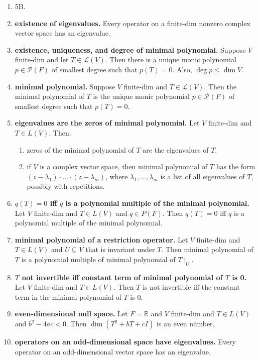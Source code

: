 \begin{enumerate}
	\item 5B. 
	\item \textbf{existence of eigenvalues. } Every operator on a finite-dim nonzero complex vector space has an eigenvalue. 
	\item \textbf{existence, uniqueness, and degree of minimal polynomial. } Suppose $V$ finite-dim and let $T \in \mathscr{L}(V)$. Then there is a unique monic polynomial $p \in \mathscr{P}(F)$ of smallest degree such that $p(T)=0$. Also, $\deg p \leq \dim V$. 
	\item \textbf{minimal polynomial. } Suppose $V$ finite-dim and $T \in \mathscr{L}(V)$. Then the minimal polynomial of $T$ is the unique monic polynomial $p \in \mathscr{P}(F)$ of smallest degree such that $p(T)=0$. 
	\item \textbf{eigenvalues are the zeros of minimal polynomial. } Let $V$ finite-dim and $T \in L(V)$. Then: 
	\begin{enumerate}
		\item zeros of the minimal polynomial of $T$ are the eigenvalues of $T$. 
		\item if $V$ is a complex vector space, then minimal polynomial of $T$ has the form $(z-\lambda_1) \cdot \dots \cdot (z-\lambda_m)$, where $\lambda_1,\dots,\lambda_m$ is a list of all eigenvalues of $T$, possibly with repetitions. 
	\end{enumerate}
	\item \textbf{$q(T)=0$ iff $q$ is a polynomial multiple of the minimal polynomial. } Let $V$ finite-dim and $T \in L(V)$ and $q \in P(F)$. Then $q(T)=0$ iff $q$ is a polynomial multiple of the minimal polynomial. 
	\item \textbf{minimal polynomial of a restriction operator. } Let $V$ finite-dim and $T \in L(V)$ and $U \subseteq V$ that is invariant under $T$. Then minimal polynomial of $T$ is a polynomial multiple of minimal polynomial of $T \mid_U$. 
	\item \textbf{$T$ not invertible iff constant term of minimal polynomial of $T$ is 0. } Let $V$ finite-dim and $T \in L(V)$. Then $T$ is not invertible iff the constant term in the minimal polynomial of $T$ is 0. 
	\item \textbf{even-dimensional null space. } Let $F = \mathbb{R}$ and $V$ finite-dim and $T \in L(V)$ and $b^2-4ac < 0$. Then $\dim(T^2 + bT + cI)$ is an even number. 
	\item \textbf{operators on an odd-dimensional space have eigenvalues. } Every operator on an odd-dimensional vector space has an eigenvalue. 

\end{enumerate}
